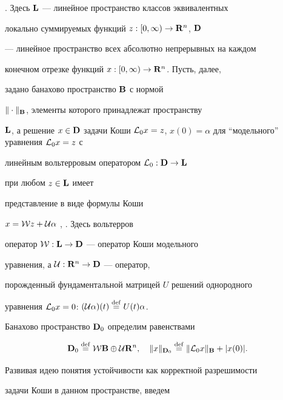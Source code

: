 \cite{4}. Здесь $\bold {L}$ --- линейное пространство классов эквивалентных


локально суммируемых функций $z:[0,\infty)\to\bold {R}^n$, $\bold {D}$


--- линейное пространство всех абсолютно непрерывных на каждом


конечном отрезке функций $x:[0,\infty)\to\bold {R}^n$. Пусть, далее,


задано банахово пространство $\bold {B}$ с нормой


$\|\cdot\|_{\bold{B}}$, элементы которого принадлежат пространству


$\spc{L}$, а решение $x\in{\spc{D}}$ задачи Коши ${\cal


L}_0x=z$, $x(0)=\alpha$ для ``модельного'' уравнения ${\cal L}_0x=z$ с


линейным вольтерровым оператором ${\cal L}_0:{\bold {D}}\to\bold {L}$


при любом $z\in\bold {L}$ имеет


представление в виде формулы Коши


$x={\cal W}z+{\cal U}\alpha$ \cite{3}, \cite{4}. Здесь вольтерров


оператор ${\cal W}:\bold {L}\to\bold {D}$ --- оператор Коши модельного


уравнения, а ${\cal U}:\bold {R}^n\to\bold {D}$ --- оператор,


порожденный фундаментальной матрицей $U$ решений однородного


уравнения ${\cal L}_0x=0$: $({\cal U}\alpha)(t)\overset{\mathrm{def}}{=}{} U(t)\alpha$.


Банахово пространство ${\bold {D}}_0$ определим равенствами


$$


\spc{D}_0\eqdef{\cal W}\spc{B}\oplus{\cal U}{\spc{R}}^n,\quad


\|x\|_{\bold{D}_0}\eqdef\|{\cal L}_0x\|_{\bold B}+|x(0)|.


$$





Развивая идею понятия устойчивости как корректной разрешимости


задачи Коши в данном пространстве, введем





